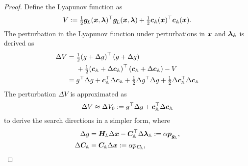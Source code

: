 \documentclass[journal]{IEEEtranTIE}
\begin{document}
\begin{proof}
Define the Lyapunov function as 
\begin{align}%
V := \tfrac{1}{2}\mv{g}_{\!L}(\mv{x},\mv{\lambda})^\top \mv{g}_{\!L}(\mv{x},\mv{\lambda}) + \tfrac{1}{2}{\mv{c}_{\mathbb{A}}(\mv{x})^\top}\mv{c}_{\mathbb{A}}(\mv{x}).
\end{align}
The perturbation in the Lyapunov function under perturbations in $\boldsymbol{x}$ and $\boldsymbol{\lambda}_{\mathbb{A}}$ is derived as
\begin{subequations}\label{eq:delta_V}
\begin{align}\nonumber
\Delta V &= \tfrac{1}{2}{\left( {g + \Delta g} \right)^\top}\left( {g + \Delta g} \right)\\\label{eq:delta_V_1}
&\ \ \ \ + \tfrac{1}{2}{\left( {\mv{c}_{\mathbb{A}} + \Delta \mv{c}_{\mathbb{A}}} \right)^\top}\left( {\mv{c}_{\mathbb{A}} + \Delta \mv{c}_{\mathbb{A}}} \right) - V\\\label{eq:delta_V_2}
 &= {g^\top}\Delta g +  \mv{c}_{\mathbb{A}}^\top\Delta \mv{c}_{\mathbb{A}} + \tfrac{1}{2}\Delta {g^\top}\Delta g + \tfrac{1}{2}\Delta \mv{c}_{\mathbb{A}}^\top\Delta \mv{c}_{\mathbb{A}}
\end{align}
\end{subequations}
The perturbation $\Delta V$ is approximated as  
\begin{align}\label{eq:delta_V0}
\Delta V \approx \Delta V_0 := {g^\top}\Delta g +  \mv{c}_{\mathbb{A}}^\top\Delta \mv{c}_{\mathbb{A}}
\end{align}
to derive the search directions in a simpler form, where
\begin{subequations}\label{eq:delta_g_c}
\begin{align}
\Delta g &= \boldsymbol{H}_{\! L}\Delta\boldsymbol{x} - \boldsymbol{C}_{\!\mathbb{A}}^\top \Delta\boldsymbol{\lambda}_{\mathbb{A}} := \alpha \boldsymbol{p}_{\boldsymbol{g}_{\! L}},\\
\Delta \boldsymbol{C}_{\!\mathbb{A}} &= \boldsymbol{C}_{\!\mathbb{A}}\Delta\boldsymbol{x} := \alpha p_{\boldsymbol{C}_{\!\mathbb{A}}},
\end{align}
\end{subequations}


\end{proof}
\end{document}
